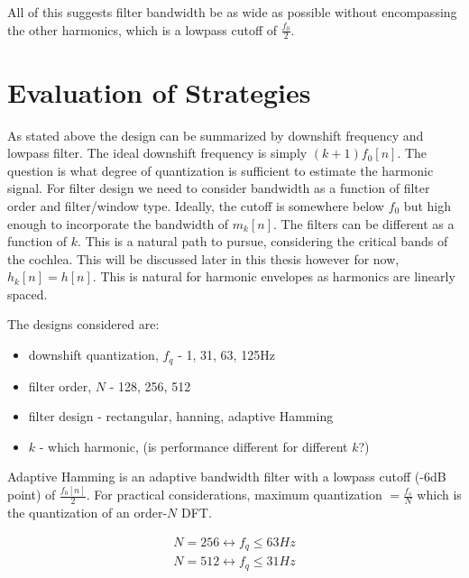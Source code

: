 \documentclass [11pt, proquest,oneside] {ganter_thesis}[2015/03/03]
\begin{document}
All of this suggests filter bandwidth be as wide as possible without encompassing the other harmonics, which is a lowpass cutoff of $\frac{f_0}{2}$.



\section{Evaluation of Strategies}

As stated above the design can be summarized by downshift frequency and lowpass filter.  The ideal downshift frequency is simply $(k+1)f_0[n]$.  The question is what degree of quantization is sufficient to estimate the harmonic signal.  For filter design we need to consider bandwidth as a function of filter order and filter/window type.  Ideally, the cutoff is somewhere below $f_0$ but high enough to incorporate the bandwidth of $m_k[n]$.  The filters can be different as a function of $k$.  This is a natural path to pursue, considering the critical bands of the cochlea.  This will be discussed later in this thesis however for now, $h_k[n] = h[n]$.  This is natural for harmonic envelopes as harmonics are linearly spaced.

The designs considered are:

\begin{itemize}
	\item downshift quantization, $f_q$ - 1, 31, 63, 125Hz
	\item filter order, $N$ - 128, 256, 512
	\item filter design - rectangular, hanning, adaptive Hamming
	\item $k$ - which harmonic, (is performance different for different $k$?)
\end{itemize}

Adaptive Hamming is an adaptive bandwidth filter with a lowpass cutoff (-6dB point) of $\frac{f_0[n]}{2}$.  For practical considerations, maximum quantization $= \frac{f_s}{N}$ which is the quantization of an order-$N$ DFT.

\begin{align}
N = 256 \longleftrightarrow f_q \leq 63Hz \nonumber \\
N = 512 \longleftrightarrow f_q \leq 31Hz \nonumber
\end{align}
\end{document}
